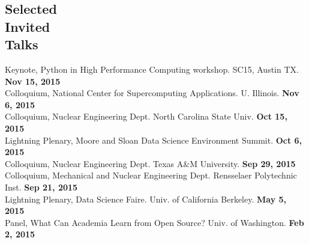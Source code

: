 \documentclass[margin,line]{resume}
\begin{document}
\begin{resume}
    \section{\mysidestyle Selected\\Invited\\Talks}
      Keynote, Python in High Performance Computing workshop. SC15, Austin TX. \hfill \textbf{Nov 15, 2015}\\
      Colloquium, National Center for Supercomputing Applications. U. Illinois. \hfill\textbf{Nov 6, 2015}\\
      Colloquium, Nuclear Engineering Dept. North Carolina State Univ. \hfill\textbf{Oct 15, 2015}\\
      Lightning Plenary, Moore and Sloan Data Science Environment Summit.  \hfill\textbf{Oct 6, 2015}\\
      Colloquium, Nuclear Engineering Dept. Texas A\&M University. \hfill\textbf{ Sep 29, 2015}\\
      Colloquium, Mechanical and Nuclear Engineering Dept. Rensselaer Polytechnic Inst. \hfill\textbf{Sep 21, 2015}\\
      Lightning Plenary, Data Science Faire. Univ. of California Berkeley. \hfill\textbf{May 5, 2015}\\
      Panel, What Can Academia Learn from Open Source? Univ. of Washington. \hfill\textbf{Feb 2, 2015}

\end{resume}
\end{document}
